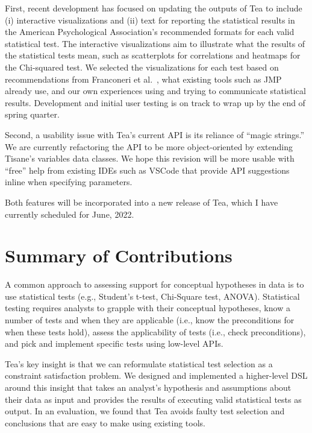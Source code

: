 First, recent development has focused on updating the outputs of Tea to include
(i) interactive visualizations and (ii) text for reporting the statistical
results in the American Psychological Association's recommended formats for each
valid statistical test. The interactive visualizations aim to illustrate what
the results of the statistical tests mean, such as scatterplots for correlations
and heatmaps for the Chi-squared test. We selected the visualizations for each
test based on recommendations from Franconeri et
al.~\cite{franconeriVisualizationChooser}, what existing tools such as
JMP~\cite{jmp} already use, and our own experiences using and trying to
communicate statistical results. Development and initial user testing is on
track to wrap up by the end of spring quarter. 

Second, a usability issue with Tea's current API is its reliance of ``magic
strings.'' We are currently refactoring the API to be more object-oriented by
extending Tisane's variables data classes. We hope this revision will be more
usable with ``free'' help from existing IDEs such as VSCode that provide API
suggestions inline when specifying parameters. 

Both features will be incorporated into a new release of Tea, which I have
currently scheduled for June, 2022. 

\section{Summary of Contributions}


A common approach to assessing support for conceptual hypotheses in data is to
use statistical tests (e.g., Student's t-test, Chi-Square test, ANOVA).
Statistical testing requires analysts to grapple with their conceptual
hypotheses, know a number of tests and when they are applicable (i.e., know the
preconditions for when these tests hold), assess the applicability of tests
(i.e., check preconditions), and pick and implement specific tests using
low-level APIs. 

Tea's key insight is that we can reformulate statistical test
selection as a constraint satisfaction problem. We designed and implemented a
higher-level DSL around this insight that takes an analyst's hypothesis and
assumptions about their data as input and provides the results of executing
valid statistical tests as output. In an evaluation, we found that Tea avoids
faulty test selection and conclusions that are easy to make using existing
tools.

